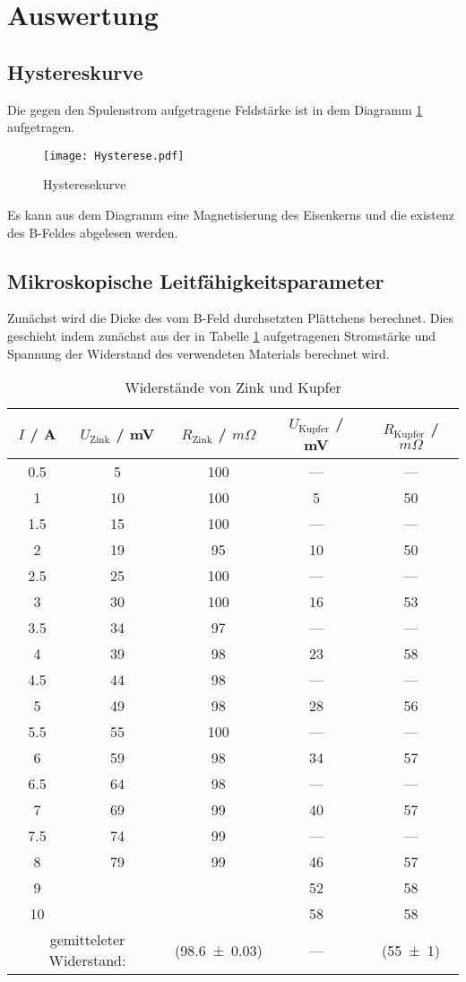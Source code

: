 \section{Auswertung}
\label{sec:Auswertung}
\subsection{Hystereskurve}
Die gegen den Spulenstrom aufgetragene Feldstärke ist in dem Diagramm \ref{fig:Hyst} aufgetragen.

\begin{figure}[H]
  \centering
  \texttt{[image: Hysterese.pdf]}
  \caption{Hysteresekurve}
  \label{fig:Hyst}
\end{figure}

Es kann aus dem Diagramm eine Magnetisierung des Eisenkerns und die existenz des B-Feldes abgelesen werden.


\subsection{Mikroskopische Leitfähigkeitsparameter}
Zunächst wird die Dicke des vom B-Feld durchsetzten Plättchens berechnet. Dies geschieht indem zunächst aus der in Tabelle \ref{tab:RZK} aufgetragenen Stromstärke und Spannung der Widerstand des verwendeten Materials berechnet wird.

\begin{table}
  \centering
  \begin{tabular}{c|c c|c c}
    \toprule
    $I$ / A & $U_\text{Zink}$ / mV & $R_\text{Zink}$ / $m\Omega$ & $U_\text{Kupfer}$ / mV & $R_\text{Kupfer}$ / $m\Omega$ \\
    \midrule
	0.5	& 5	& 100	& ---	& ---	\\
	1	& 10	& 100	& 5	& 50	\\
	1.5	& 15	& 100	& ---	& ---	\\
	2	& 19	& 95	& 10	& 50	\\
	2.5	& 25	& 100	& ---	& ---	\\
	3	& 30	& 100	& 16 	& 53	\\
	3.5	& 34	& 97	& ---	& ---	\\
	4	& 39	& 98	& 23	& 58	\\
	4.5	& 44	& 98	& ---	& ---	\\
	5	& 49	& 98	& 28	& 56	\\
	5.5	& 55	& 100	& ---	& ---	\\
	6	& 59	& 98	& 34	& 57	\\
	6.5	& 64	& 98	& ---	& ---	\\
	7	& 69	& 99	& 40  	& 57	\\
	7.5	& 74	& 99	& ---	& ---	\\
	8	& 79	& 99	& 46	& 57	\\
	9	&	&	& 52	& 58	\\
	10	&	&	& 58	& 58	\\
    \midrule
    \multicolumn{2}{c}{gemitteleter Widerstand:}& (\num{98.6 +- 0.03}) & --- & (\num{55 +- 1}) \\
    \bottomrule
  \end{tabular}
  \caption{Widerstände von Zink und Kupfer}
  \label{tab:RZK}
\end{table}

